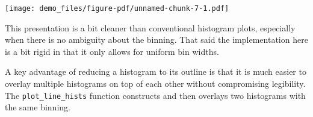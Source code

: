 \documentclass[
  letterpaper,
  DIV=11,
  numbers=noendperiod]{scrartcl}
\newenvironment{Shaded}{\begin{snugshade}}{\end{snugshade}}
\newcommand{\AttributeTok}[1]{\textcolor[rgb]{0.40,0.45,0.13}{#1}}
\newcommand{\DecValTok}[1]{\textcolor[rgb]{0.68,0.00,0.00}{#1}}
\newcommand{\FloatTok}[1]{\textcolor[rgb]{0.68,0.00,0.00}{#1}}
\newcommand{\FunctionTok}[1]{\textcolor[rgb]{0.28,0.35,0.67}{#1}}
\newcommand{\NormalTok}[1]{\textcolor[rgb]{0.00,0.23,0.31}{#1}}
\newcommand{\SpecialCharTok}[1]{\textcolor[rgb]{0.37,0.37,0.37}{#1}}
\newcommand{\StringTok}[1]{\textcolor[rgb]{0.13,0.47,0.30}{#1}}
\begin{document}
\begin{Shaded}
\end{Shaded}

\texttt{[image: demo\_files/figure-pdf/unnamed-chunk-7-1.pdf]}

This presentation is a bit cleaner than conventional histogram plots,
especially when there is no ambiguity about the binning. That said the
implementation here is a bit rigid in that it only allows for uniform
bin widths.

A key advantage of reducing a histogram to its outline is that it is
much easier to overlay multiple histograms on top of each other without
compromising legibility. The \texttt{plot\_line\_hists} function
constructs and then overlays two histograms with the same binning.

\begin{Shaded}
\end{Shaded}
\end{document}
